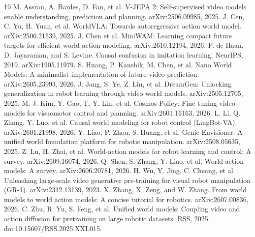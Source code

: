 \documentclass[11pt]{article}
\begin{document}
{\small
\begin{thebibliography}{19}
 M. Assran, A. Bardes, D. Fan, et al. V-JEPA 2: Self-supervised video models enable understanding, prediction and planning. arXiv:2506.09985, 2025.
 J. Cen, C. Yu, H. Yuan, et al. WorldVLA: Towards autoregressive action world model. arXiv:2506.21539, 2025.
 J. Chen et al. MiniWAM: Learning compact future targets for efficient world-action modeling. arXiv:2610.12194, 2026.
 P. de Haan, D. Jayaraman, and S. Levine. Causal confusion in imitation learning. NeurIPS, 2019. arXiv:1905.11979.
 S. Huang, P. Kaushik, M. Chen, et al. Nano World Models: A minimalist implementation of future video prediction. arXiv:2605.23993, 2026.
 J. Jang, S. Ye, Z. Lin, et al. DreamGen: Unlocking generalization in robot learning through video world models. arXiv:2505.12705, 2025.
 M. J. Kim, Y. Gao, T.-Y. Lin, et al. Cosmos Policy: Fine-tuning video models for visuomotor control and planning. arXiv:2601.16163, 2026.
 L. Li, Q. Zhang, Y. Luo, et al. Causal world modeling for robot control (LingBot-VA). arXiv:2601.21998, 2026.
 Y. Liao, P. Zhou, S. Huang, et al. Genie Envisioner: A unified world foundation platform for robotic manipulation. arXiv:2508.05635, 2025.
 Z. Lu, H. Zhai, et al. World-action models for robot learning and control: A survey. arXiv:2609.16074, 2026.
 Q. Shen, S. Zhang, Y. Liao, et al. World action models: A survey. arXiv:2606.20781, 2026.
 H. Wu, Y. Jing, C. Cheang, et al. Unleashing large-scale video generative pre-training for visual robot manipulation (GR-1). arXiv:2312.13139, 2023.
 X. Zhang, X. Zeng, and W. Zhang. From world models to world action models: A concise tutorial for robotics. arXiv:2607.00836, 2026.
 C. Zhu, R. Yu, S. Feng, et al. Unified world models: Coupling video and action diffusion for pretraining on large robotic datasets. RSS, 2025. doi:10.15607/RSS.2025.XXI.015.
\end{thebibliography}
}
\end{document}
